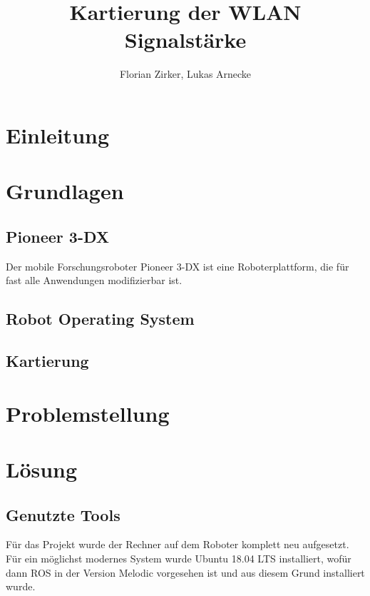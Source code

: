 \documentclass{scrartcl}%
\begin{document}
\titlehead{AMR}%
\subject{Projektbericht AMR}%
\title{Kartierung der WLAN Signalstärke}%
\author{Florian Zirker, Lukas Arnecke}%
\publishers{Prof. Dr. Thomas Ihme}%
\maketitle%
\tableofcontents

\section{Einleitung}

\section{Grundlagen}
\subsection{Pioneer 3-DX}
Der mobile Forschungsroboter Pioneer 3-DX ist eine Roboterplattform, die für fast alle Anwendungen modifizierbar ist.
\subsection{Robot Operating System}
\subsection{Kartierung}

\section{Problemstellung}

\section{Lösung}
\subsection{Genutzte Tools}
Für das Projekt wurde der Rechner auf dem Roboter komplett neu aufgesetzt. Für ein möglichst modernes System wurde Ubuntu 18.04 LTS installiert, wofür dann ROS in der Version Melodic vorgesehen ist und aus diesem Grund installiert wurde.
\end{document}
